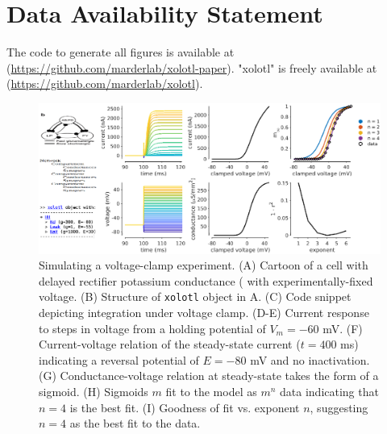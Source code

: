 \documentclass{frontiersSCNS} %
\begin{document}
\section*{Data Availability Statement}

The code to generate all figures is available at (\url{https://github.com/marderlab/xolotl-paper}). "xolotl" is freely available at (\url{https://github.com/marderlab/xolotl}).

%
%
%
%
%
%

\printbibliography

%
%
%
%
%
%



\FloatBarrier



\begin{figure}
	\centering
	\includegraphics[width=1.0\linewidth]{gfx/figure_clamp}
	\caption{Simulating a voltage-clamp experiment. (A) Cartoon of a cell with delayed rectifier potassium conductance (\cite{liuModelNeuronActivitydependent1998} with experimentally-fixed voltage. (B) Structure of \texttt{xolotl} object in A. (C) Code snippet depicting integration under voltage clamp. (D-E) Current response to steps in voltage from a holding potential of $V_m = -60$ mV. (F) Current-voltage relation of the steady-state current ($t = 400$ ms) indicating a reversal potential of $E = -80$ mV and no inactivation. (G) Conductance-voltage relation at steady-state takes the form of a sigmoid. (H) Sigmoids $m$ fit to the model as $m^n$ data indicating that $n=4$ is the best fit. (I) Goodness of fit vs. exponent $n$, suggesting $n=4$ as the best fit to the data.}
	\label{fig:figureclamp}
\end{figure}
\end{document}
